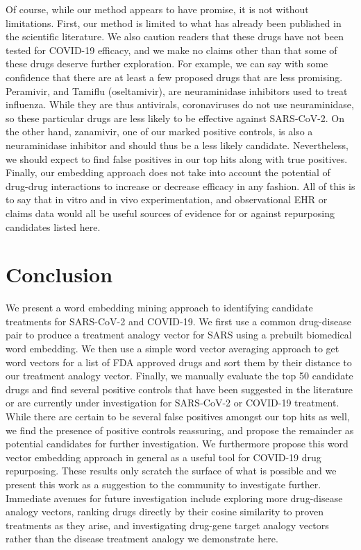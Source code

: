 \documentclass{article}
\begin{document}
Of course, while our method appears to have promise, it is not without limitations.
First, our method is limited to what has already been published in the scientific literature.
We also caution readers that these drugs have not been tested for COVID-19 efficacy, and we make no claims other than that some of these drugs deserve further exploration.
For example, we can say with some confidence that there are at least a few proposed drugs that are less promising.
Peramivir, and Tamiflu (oseltamivir), are neuraminidase inhibitors used to treat influenza.
While they are thus antivirals, coronaviruses do not use neuraminidase, so these particular drugs are less likely to be effective against SARS-CoV-2\cite{mccreary2020coronavirus}.
On the other hand, zanamivir, one of our marked positive controls\cite{hall2020search}, is also a neuraminidase inhibitor and should thus be a less likely candidate.
Nevertheless, we should expect to find false positives in our top hits along with true positives.
Finally, our embedding approach does not take into account the potential of drug-drug interactions to increase or decrease efficacy in any fashion.
All of this is to say that in vitro and in vivo experimentation, and observational EHR or claims data would all be useful sources of evidence for or against repurposing candidates listed here.


\section{Conclusion}

We present a word embedding mining approach to identifying candidate treatments for SARS-CoV-2 and COVID-19.
We first use a common drug-disease pair to produce a treatment analogy vector for SARS using a prebuilt biomedical word embedding.
We then use a simple word vector averaging approach to get word vectors for a list of FDA approved drugs and sort them by their distance to our treatment analogy vector.
Finally, we manually evaluate the top 50 candidate drugs and find several positive controls that have been suggested in the literature or are currently under investigation for SARS-CoV-2 or COVID-19 treatment.
While there are certain to be several false positives amongst our top hits as well, we find the presence of positive controls reassuring, and propose the remainder as potential candidates for further investigation.
We furthermore propose this word vector embedding approach in general as a useful tool for COVID-19 drug repurposing.
These results only scratch the surface of what is possible and we present this work as a suggestion to the community to investigate further.
Immediate avenues for future investigation include exploring more drug-disease analogy vectors, ranking drugs directly by their cosine similarity to proven treatments as they arise, and investigating drug-gene target analogy vectors rather than the disease treatment analogy we demonstrate here.



\end{document}
